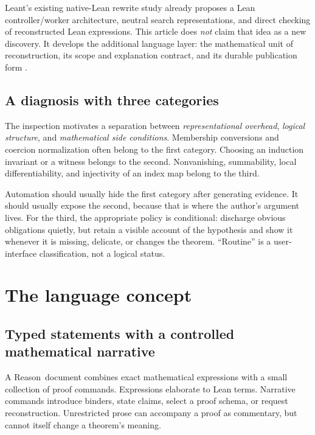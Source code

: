 \documentclass[11pt,a4paper]{article}
\newcommand{\Reason}{\textsf{Reason}}
\theoremstyle{remark}
\begin{document}
Leant's existing native-Lean rewrite study already proposes a Lean controller/worker architecture, neutral search representations, and direct checking of reconstructed Lean expressions. This article does \emph{not} claim that idea as a new discovery. It develops the additional language layer: the mathematical unit of reconstruction, its scope and explanation contract, and its durable publication form \cite{leant-rewrite}.

\subsection{A diagnosis with three categories}

The inspection motivates a separation between \emph{representational overhead}, \emph{logical structure}, and \emph{mathematical side conditions}. Membership conversions and coercion normalization often belong to the first category. Choosing an induction invariant or a witness belongs to the second. Nonvanishing, summability, local differentiability, and injectivity of an index map belong to the third.

Automation should usually hide the first category after generating evidence. It should usually expose the second, because that is where the author's argument lives. For the third, the appropriate policy is conditional: discharge obvious obligations quietly, but retain a visible account of the hypothesis and show it whenever it is missing, delicate, or changes the theorem. ``Routine'' is a user-interface classification, not a logical status.

\section{The language concept}\label{sec:language}

\subsection{Typed statements with a controlled mathematical narrative}

A \Reason\ document combines exact mathematical expressions with a small collection of proof commands. Expressions elaborate to Lean terms. Narrative commands introduce binders, state claims, select a proof schema, or request reconstruction. Unrestricted prose can accompany a proof as commentary, but cannot itself change a theorem's meaning.
\end{document}
